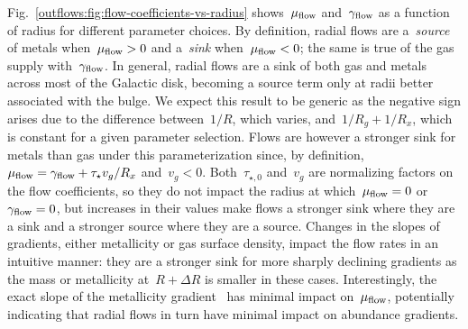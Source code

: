 Fig.~\ref{outflows:fig:flow-coefficients-vs-radius} shows~$\mu_{\text{flow}}$
and~$\gamma_{\text{flow}}$ as a function of radius for different parameter choices.
By definition, radial flows are a~\textit{source} of metals when~$\mu_{\text{flow}} > 0$
and a~\textit{sink} when~$\mu_{\text{flow}} < 0$; the same is true of the gas supply
with~$\gamma_{\text{flow}}$.
In general, radial flows are a sink of both gas and metals across most of the
Galactic disk, becoming a source term only at radii better associated with the
bulge.
We expect this result to be generic as the negative sign arises due to the
difference between~$1 / R$, which varies, and~$1 / R_g + 1 / R_x$, which is
constant for a given parameter selection.
Flows are however a stronger sink for metals than gas under this
parameterization since, by definition,~$\mu_{\text{flow}} = \gamma_{\text{flow}} + \tau_\star
v_g / R_x$ and~$v_g < 0$.
Both~$\tau_{\star,0}$ and~$v_g$ are normalizing factors on the flow
coefficients, so they do not impact the radius at which~$\mu_{\text{flow}} = 0$ or
$\gamma_{\text{flow}} = 0$, but increases in their values make flows a stronger sink
where they are a sink and a stronger source where they are a source.
Changes in the slopes of gradients, either metallicity or gas surface density,
impact the flow rates in an intuitive manner: they are a stronger sink for more
sharply declining gradients as the mass or metallicity at~$R + \Delta R$ is
smaller in these cases.
Interestingly, the exact slope of the metallicity gradient~ has minimal
impact on~$\mu_{\text{flow}}$, potentially indicating that radial flows in turn have
minimal impact on abundance gradients.


